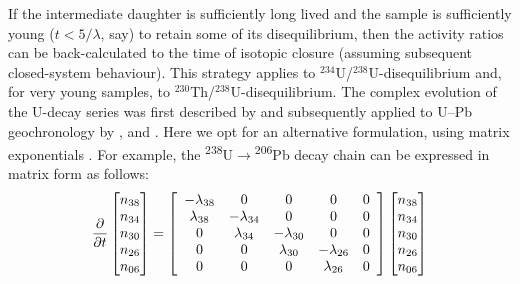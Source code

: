 \documentclass{article}
\begin{document}
If the intermediate daughter is sufficiently long lived and the sample
is sufficiently young ($t < 5/\lambda$, say) to retain some of its
disequilibrium, then the activity ratios can be back-calculated to the
time of isotopic closure (assuming subsequent closed-system
behaviour).  This strategy applies to
$^{234}$U/$^{238}$U-disequilibrium and, for very young samples, to
$^{230}$Th/$^{238}$U-disequilibrium. The complex evolution of the
U-decay series was first described by \citet{bateman1908} and
subsequently applied to U--Pb geochronology by \citet{ludwig1977},
\citet{wendt1985} and \citet{engel2019}. Here we opt for an
alternative formulation, using matrix exponentials
\citep{albarede1995}.  For example, the
\textsuperscript{238}U$\rightarrow$\textsuperscript{206}Pb decay chain
can be expressed in matrix form as follows:
\begin{equation}
  \frac{\partial}{\partial{t}}\left[
    \begin{array}{@{}c@{}}
      n_{38}\\
      n_{34}\\
      n_{30}\\
      n_{26}\\
      n_{06}
    \end{array}
  \right]
  =
  \left[
    \begin{array}{ccccc}
      -\lambda_{38} & 0 & 0 & 0 & 0 \\
      \lambda_{38} & -\lambda_{34} & 0 & 0 & 0 \\
      0 & \lambda_{34} & -\lambda_{30} & 0 & 0 \\
      0 & 0 & \lambda_{30} & -\lambda_{26} & 0 \\
      0 & 0 & 0 & \lambda_{26} & 0\\
    \end{array}
    \right]
  \left[
    \begin{array}{@{}c@{}}
      n_{38}\\
      n_{34}\\
      n_{30}\\
      n_{26}\\
      n_{06}
    \end{array}
    \right]
  \label{eq:matrixdecay}
\end{equation}
\end{document}
